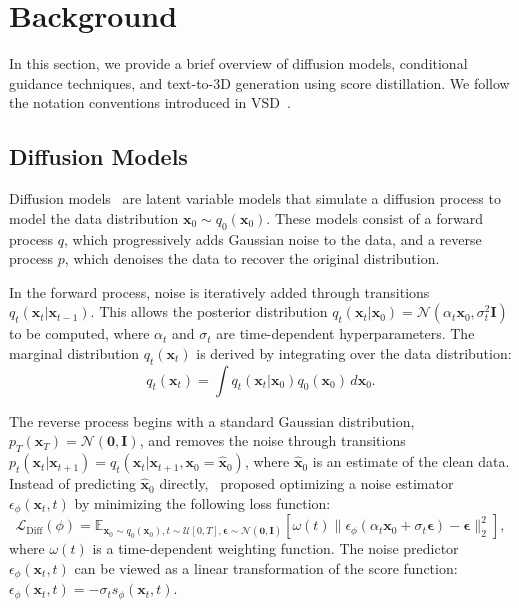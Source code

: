\section{Background}
In this section, we provide a brief overview of diffusion models, conditional guidance techniques, and text-to-3D generation using score distillation. We follow the notation conventions introduced in VSD~\citep{wang2024prolificdreamer}.

\subsection{Diffusion Models}
Diffusion models~\citep{sohl2015deep, ho2020denoising, song2020score} are latent variable models that simulate a diffusion process to model the data distribution $\boldsymbol{x}_0 \sim q_0(\boldsymbol{x}_0)$. These models consist of a forward process $q$, which progressively adds Gaussian noise to the data, and a reverse process $p$, which denoises the data to recover the original distribution.

In the forward process, noise is iteratively added through transitions $q_t(\boldsymbol{x}_t|\boldsymbol{x}_{t-1})$. This allows the posterior distribution $q_t(\boldsymbol{x}_t|\boldsymbol{x}_0) = \mathcal{N}(\alpha_t \boldsymbol{x}_0, \sigma_t^2 \boldsymbol{I})$ to be computed, where $\alpha_t$ and $\sigma_t$ are time-dependent hyperparameters. The marginal distribution $q_t(\boldsymbol{x}_t)$ is derived by integrating over the data distribution:
\begin{equation}
q_t(\boldsymbol{x}_t) = \int q_t(\boldsymbol{x}_t|\boldsymbol{x}_0)q_0(\boldsymbol{x}_0)\,d\boldsymbol{x}_0.
\end{equation}

The reverse process begins with a standard Gaussian distribution, $p_T(\boldsymbol{x}_T) = \mathcal{N}(\boldsymbol{0}, \boldsymbol{I})$, and removes the noise through transitions $p_t(\boldsymbol{x}_t|\boldsymbol{x}_{t+1}) = q_t(\boldsymbol{x}_t|\boldsymbol{x}_{t+1}, \boldsymbol{x}_0 = \hat{\boldsymbol{x}}_0)$, where $\hat{\boldsymbol{x}}_0$ is an estimate of the clean data. Instead of predicting $\hat{\boldsymbol{x}}_0$ directly,~\citet{ho2020denoising} proposed optimizing a noise estimator $\epsilon_\phi(\boldsymbol{x}_t, t)$ by minimizing the following loss function:
\begin{equation}
    \mathcal{L}_{\mathrm{Diff}}(\phi) = \mathbb{E}_{\boldsymbol{x}_0 \sim q_0(\boldsymbol{x}_0), t \sim \mathcal{U}[0,T], \boldsymbol{\epsilon} \sim \mathcal{N}(\boldsymbol{0}, \boldsymbol{I})} \left[ \omega(t)\|\epsilon_\phi(\alpha_t \boldsymbol{x}_0 + \sigma_t \boldsymbol{\epsilon}) - \boldsymbol{\epsilon}\|_2^2 \right],
\end{equation}
where $\omega(t)$ is a time-dependent weighting function. The noise predictor $\epsilon_\phi(\boldsymbol{x}_t, t)$ can be viewed as a linear transformation of the score function: $\epsilon_\phi(\boldsymbol{x}_t, t) = -\sigma_t s_\phi(\boldsymbol{x}_t, t)$.

